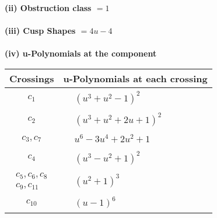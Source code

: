 \documentclass[1p]{elsarticle_modified}
\theoremstyle{definition}
\begin{document}
\flushleft \textbf{(ii) Obstruction class $= 1$}\\~\\
\flushleft \textbf{(iii) Cusp Shapes $= 4 u-4$}\\~\\
\newpage\renewcommand{\arraystretch}{1}
\flushleft \textbf{(iv) u-Polynomials at the component}\newline \\
\begin{tabular}{m{50pt}|m{274pt}}
Crossings & \hspace{64pt}u-Polynomials at each crossing \\
\hline $$\begin{aligned}c_{1}\end{aligned}$$&$\begin{aligned}
&(u^3+u^2-1)^2
\end{aligned}$\\
\hline $$\begin{aligned}c_{2}\end{aligned}$$&$\begin{aligned}
&(u^3+u^2+2 u+1)^2
\end{aligned}$\\
\hline $$\begin{aligned}c_{3},c_{7}\end{aligned}$$&$\begin{aligned}
&u^6-3 u^4+2 u^2+1
\end{aligned}$\\
\hline $$\begin{aligned}c_{4}\end{aligned}$$&$\begin{aligned}
&(u^3- u^2+1)^2
\end{aligned}$\\
\hline $$\begin{aligned}c_{5},c_{6},c_{8}\\c_{9},c_{11}\end{aligned}$$&$\begin{aligned}
&(u^2+1)^3
\end{aligned}$\\
\hline $$\begin{aligned}c_{10}\end{aligned}$$&$\begin{aligned}
&(u-1)^6
\end{aligned}$\\
\hline
\end{tabular}\\~\\
\end{document}
